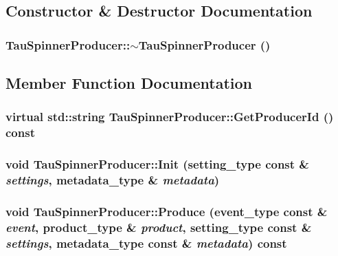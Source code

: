 \subsection{Constructor \& Destructor Documentation}
\hypertarget{classTauSpinnerProducer_a344c89bc8805deba03c0a6a2ba46d076}{
\subsubsection[{$\sim$TauSpinnerProducer}]{\setlength{\rightskip}{0pt plus 5cm}TauSpinnerProducer::$\sim$TauSpinnerProducer ()}}
\label{classTauSpinnerProducer_a344c89bc8805deba03c0a6a2ba46d076}


\subsection{Member Function Documentation}
\hypertarget{classTauSpinnerProducer_a712031787a9a2142ab2469080358dc45}{
\subsubsection[{GetProducerId}]{\setlength{\rightskip}{0pt plus 5cm}virtual std::string TauSpinnerProducer::GetProducerId () const}}
\label{classTauSpinnerProducer_a712031787a9a2142ab2469080358dc45}
\hypertarget{classTauSpinnerProducer_a9a7f5c13182618efc948cfdb44435d51}{
\subsubsection[{Init}]{\setlength{\rightskip}{0pt plus 5cm}void TauSpinnerProducer::Init (setting\_\-type const \& {\em settings}, \/  metadata\_\-type \& {\em metadata})}}
\label{classTauSpinnerProducer_a9a7f5c13182618efc948cfdb44435d51}
\hypertarget{classTauSpinnerProducer_acb56109bf7e4400eb1f98b614f5e297a}{
\subsubsection[{Produce}]{\setlength{\rightskip}{0pt plus 5cm}void TauSpinnerProducer::Produce (event\_\-type const \& {\em event}, \/  product\_\-type \& {\em product}, \/  setting\_\-type const \& {\em settings}, \/  metadata\_\-type const \& {\em metadata}) const}}
\label{classTauSpinnerProducer_acb56109bf7e4400eb1f98b614f5e297a}



